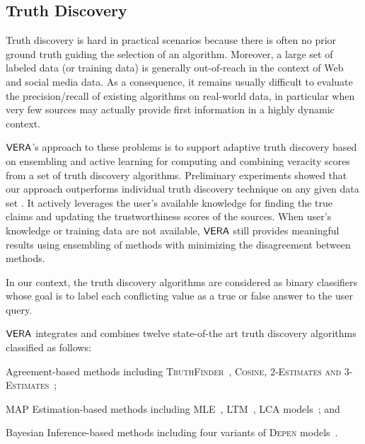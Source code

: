 
\subsection{Truth Discovery}\label{truthfinding}

Truth discovery is hard in practical scenarios because there is often no prior ground truth guiding
the selection of an algorithm. Moreover, a large set of labeled 
data (or training data) is generally out-of-reach in the context of Web and social media data. As a consequence, it remains usually difficult to evaluate the precision/recall of existing algorithms on real-world data, in particular when very few sources may actually provide first information in a highly dynamic context.%



 $\mathsf{VERA}$'s  approach to these problems is to support  adaptive truth discovery based on ensembling and active learning for computing and combining veracity scores from a set of truth discovery algorithms. Preliminary experiments  showed that our approach outperforms individual truth discovery technique on any given data set  \cite{BigData15}. It actively leverages the user's available knowledge  for finding the true claims and updating the trustworthiness scores of the sources. When user's knowledge or training data are not available, $\mathsf{VERA}$ still provides meaningful results using ensembling of methods with minimizing the disagreement between methods.

In our context, the truth discovery algorithms are considered as  binary classifiers whose goal is to label each conflicting value as a true or false answer to the user query.

$\mathsf{VERA}$ integrates and combines  twelve state-of-the art truth discovery algorithms classified as follows:
\begin{inparaenum}[(1)]
\item Agreement-based methods including  {\scshape TruthFinder}~\cite{YinHY08},
  {\scshape Cosine, 2-Estimates and 3-Estimates}~\cite{GallandAMS10}; 
\item MAP Estimation-based methods including  MLE~\cite{WangKLA12}, 
 LTM~\cite{ZhaoRGH12}, 
LCA models~\cite{PasternackR13}; and
 \item Bayesian Inference-based methods including  four variants of {\scshape Depen} models~\cite{DongBS09}.
\end{inparaenum}


